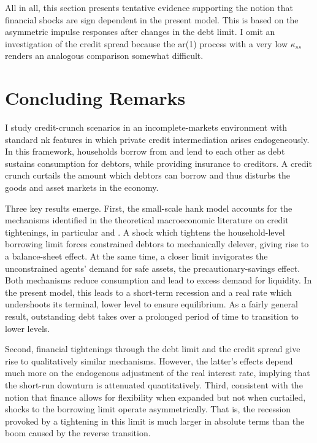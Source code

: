 \documentclass[a4paper,12pt]{article} %
\numberwithin{equation}{section} %
\numberwithin{figure}{section}
\numberwithin{table}{section}
\begin{document}
All in all, this section presents tentative evidence supporting the notion that financial shocks are sign dependent in the present model. This is based on the asymmetric impulse responses after changes in the debt limit. I omit an investigation of the credit spread because the \Gls{ar}(1) process with a very low $\kappa_{ss}$ renders an analogous comparison somewhat difficult.

\section{Concluding Remarks}
\label{sec:conclusion}

I study credit-crunch scenarios in an incomplete-markets environment with standard \Gls{nk} features in which private credit intermediation arises endogeneously. In this framework, households borrow from and lend to each other as debt sustains consumption for debtors, while providing insurance to creditors. A credit crunch curtails the amount which debtors can borrow and thus disturbs the goods and asset markets in the economy. 

Three key results emerge. First, the small-scale \Gls{hank} model accounts for the mechanisms identified in the theoretical macroeconomic literature on credit tightenings, in particular \textcite{egg2012} and \textcite{gl2017}. A shock which tightens the household-level borrowing limit forces constrained debtors to mechanically delever, giving rise to a balance-sheet effect. At the same time, a closer limit invigorates the unconstrained agents' demand for safe assets, the precautionary-savings effect. Both mechanisms reduce consumption and lead to excess demand for liquidity. In the present model, this leads to a short-term recession and a real rate which undershoots its terminal, lower level to ensure equilibrium. As a fairly general result, outstanding debt takes over a prolonged period of time to transition to lower levels.

Second, financial tightenings through the debt limit and the credit spread give rise to qualitatively similar mechanisms. However, the latter's effects depend much more on the endogenous adjustment of the real interest rate, implying that the short-run downturn is attenuated quantitatively. Third, consistent with the notion that finance allows for flexibility when expanded but not when curtailed, shocks to the borrowing limit operate asymmetrically. That is, the recession provoked by a tightening in this limit is much larger in absolute terms than the boom caused by the reverse transition.
\end{document}
